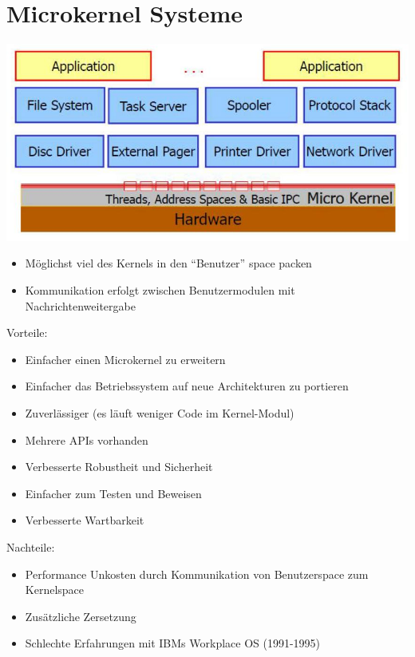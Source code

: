 \documentclass[a4paper]{scrreprt}
\begin{document}
\section{Microkernel Systeme}
	\begin{center}
		\includegraphics[scale=0.3]{graphics/microkernel.png}
	\end{center}

	\begin{itemize}
		\item Möglichst viel des Kernels in den "`Benutzer"' space packen
		\item Kommunikation erfolgt zwischen Benutzermodulen mit Nachrichtenweitergabe
	\end{itemize}
	
	Vorteile:
		\begin{itemize}
			\item Einfacher einen Microkernel zu erweitern
			\item Einfacher das Betriebssystem auf neue Architekturen zu portieren
			\item Zuverlässiger (es läuft weniger Code im Kernel-Modul)
			\item Mehrere APIs vorhanden
			\item Verbesserte Robustheit und Sicherheit
			\item Einfacher zum Testen und Beweisen
			\item Verbesserte Wartbarkeit
		\end{itemize}
	Nachteile:
		\begin{itemize}
			\item Performance Unkosten durch Kommunikation von Benutzerspace zum Kernelspace 
			\item Zusätzliche Zersetzung
			\item Schlechte Erfahrungen mit IBMs Workplace OS (1991-1995)
		\end{itemize}
\end{document}
